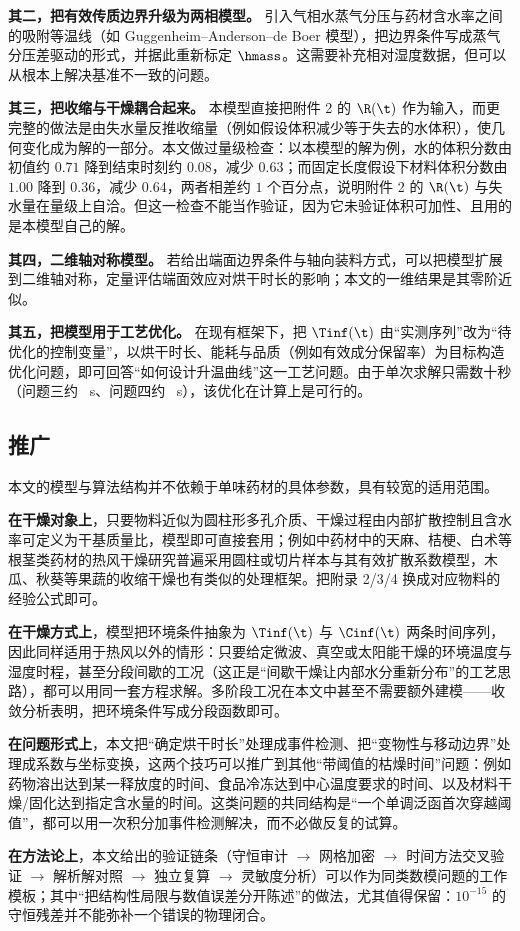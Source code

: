 \textbf{其二，把有效传质边界升级为两相模型。} 引入气相水蒸气分压与药材含水率之间的吸附等温线（如 Guggenheim--Anderson--de Boer 模型），把边界条件写成蒸气分压差驱动的形式，并据此重新标定 $\hmass$。这需要补充相对湿度数据，但可以从根本上解决基准不一致的问题。

\textbf{其三，把收缩与干燥耦合起来。} 本模型直接把附件 2 的 $\R(\t)$ 作为输入，而更完整的做法是由失水量反推收缩量（例如假设体积减少等于失去的水体积），使几何变化成为解的一部分。本文做过量级检查：以本模型的解为例，水的体积分数由初值约 $0.71$ 降到结束时刻约 $0.08$，减少 $0.63$；而固定长度假设下材料体积分数由 $1.00$ 降到 $0.36$，减少 $0.64$，两者相差约 $1$ 个百分点，说明附件 2 的 $\R(\t)$ 与失水量在量级上自洽。但这一检查不能当作验证，因为它未验证体积可加性、且用的是本模型自己的解。

\textbf{其四，二维轴对称模型。} 若给出端面边界条件与轴向装料方式，可以把模型扩展到二维轴对称，定量评估端面效应对烘干时长的影响；本文的一维结果是其零阶近似。

\textbf{其五，把模型用于工艺优化。} 在现有框架下，把 $\Tinf(\t)$ 由``实测序列''改为``待优化的控制变量''，以烘干时长、能耗与品质（例如有效成分保留率）为目标构造优化问题，即可回答``如何设计升温曲线''这一工艺问题。由于单次求解只需数十秒（问题三约 \QThreeWallS~s、问题四约 \QFourWallS~s），该优化在计算上是可行的。

\subsection{推广}

本文的模型与算法结构并不依赖于单味药材的具体参数，具有较宽的适用范围。

\textbf{在干燥对象上}，只要物料近似为圆柱形多孔介质、干燥过程由内部扩散控制且含水率可定义为干基质量比，模型即可直接套用；例如中药材中的天麻、桔梗、白术等根茎类药材的热风干燥研究普遍采用圆柱或切片样本与其有效扩散系数模型\cite{gastrodia2021,platycodon2020}，木瓜、秋葵等果蔬的收缩干燥也有类似的处理框架\cite{okra2025}。把附录 2/3/4 换成对应物料的经验公式即可。

\textbf{在干燥方式上}，模型把环境条件抽象为 $\Tinf(\t)$ 与 $\Cinf(\t)$ 两条时间序列，因此同样适用于热风以外的情形：只要给定微波、真空或太阳能干燥的环境温度与湿度时程，甚至分段间歇的工况（这正是``间歇干燥让内部水分重新分布''的工艺思路），都可以用同一套方程求解\cite{review2021,gastrodia2021}。多阶段工况在本文中甚至不需要额外建模——收敛分析表明，把环境条件写成分段函数即可。

\textbf{在问题形式上}，本文把``确定烘干时长''处理成事件检测、把``变物性与移动边界''处理成系数与坐标变换，这两个技巧可以推广到其他``带阈值的枯燥时间''问题：例如药物溶出达到某一释放度的时间、食品冷冻达到中心温度要求的时间、以及材料干燥/固化达到指定含水量的时间。这类问题的共同结构是``一个单调泛函首次穿越阈值''，都可以用一次积分加事件检测解决，而不必做反复的试算。

\textbf{在方法论上}，本文给出的验证链条（守恒审计 $\to$ 网格加密 $\to$ 时间方法交叉验证 $\to$ 解析解对照 $\to$ 独立复算 $\to$ 灵敏度分析）可以作为同类数模问题的工作模板；其中``把结构性局限与数值误差分开陈述''的做法，尤其值得保留：$10^{-15}$ 的守恒残差并不能弥补一个错误的物理闭合。
